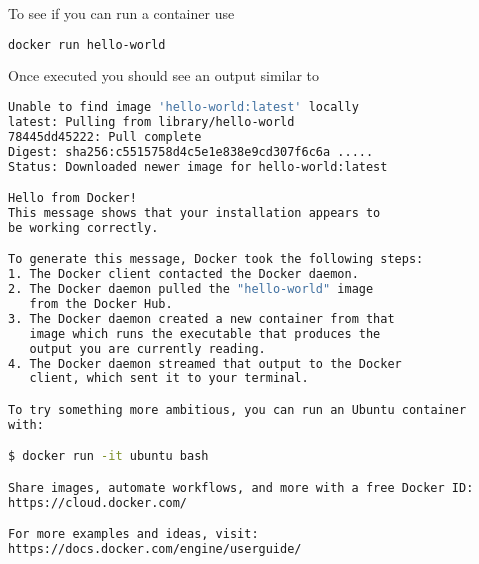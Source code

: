 To see if you can run a container use

\begin{lstlisting}[language=bash]
docker run hello-world
\end{lstlisting}

Once executed you should see an output similar to

\begin{lstlisting}[language=bash]
Unable to find image 'hello-world:latest' locally
latest: Pulling from library/hello-world
78445dd45222: Pull complete 
Digest: sha256:c5515758d4c5e1e838e9cd307f6c6a .....
Status: Downloaded newer image for hello-world:latest

Hello from Docker!
This message shows that your installation appears to 
be working correctly.

To generate this message, Docker took the following steps:
1. The Docker client contacted the Docker daemon.
2. The Docker daemon pulled the "hello-world" image 
   from the Docker Hub.
3. The Docker daemon created a new container from that 
   image which runs the executable that produces the 
   output you are currently reading.
4. The Docker daemon streamed that output to the Docker 
   client, which sent it to your terminal.

To try something more ambitious, you can run an Ubuntu container 
with:

$ docker run -it ubuntu bash

Share images, automate workflows, and more with a free Docker ID:
https://cloud.docker.com/

For more examples and ideas, visit:
https://docs.docker.com/engine/userguide/
\end{lstlisting}
